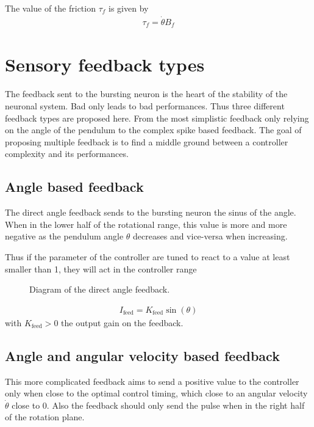 The value of the friction $\tau_f$ is given by 
\begin{align}
    \tau_f = \dot{\theta}B_f
\end{align}

\section{Sensory feedback types}

The feedback sent to the bursting neuron is the heart of the stability of the neuronal system. Bad only leads to bad performances. Thus three different feedback types are proposed here. From the most simplistic feedback only relying on the angle of the pendulum to the complex spike based feedback. The goal of proposing multiple feedback is to find a middle ground between a controller complexity and its performances. 

\subsection{Angle based feedback}

The direct angle feedback sends to the bursting neuron the sinus of the angle. When in the lower half of the rotational range, this value is more and more negative as the pendulum angle $\theta$ decreases and vice-versa when increasing. 

Thus if the parameter of the controller are tuned to react to a value at least smaller than 1, they will act in the controller range 

\begin{figure}[!htb]
    \centering
    \caption{Diagram of the direct angle feedback.}
    \label{fig:direct_angle}
\end{figure}

\begin{align}
    I_\text{feed} = K_\text{feed}\sin\left(\theta\right)
\end{align}
with $K_\text{feed} > 0$ the output gain on the feedback.


\subsection{Angle and angular velocity based feedback}\label{sec:speed_feed}

This more complicated feedback aims to send a positive value to the controller only when close to the optimal control timing, which close to an angular velocity $\dot{\theta}$ close to $0$. Also the feedback should only send the pulse when in the right half of the rotation plane.

